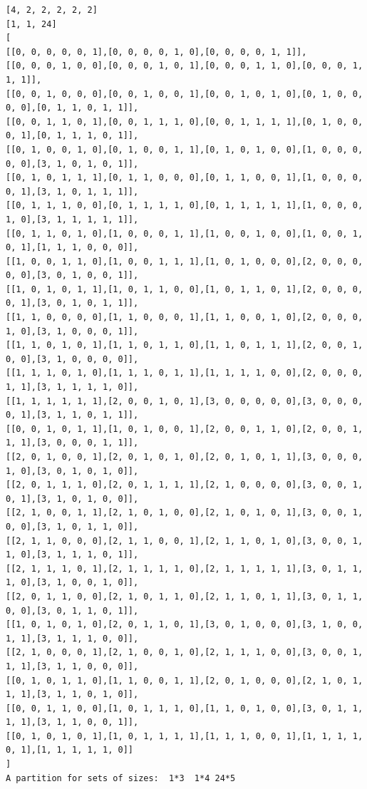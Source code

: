 \documentclass[final]{dmtcs-episciences}
\begin{document}
\begin{appendices}
\begin{verbatim}
[4, 2, 2, 2, 2, 2]
[1, 1, 24]
[
[[0, 0, 0, 0, 0, 1],[0, 0, 0, 0, 1, 0],[0, 0, 0, 0, 1, 1]],
[[0, 0, 0, 1, 0, 0],[0, 0, 0, 1, 0, 1],[0, 0, 0, 1, 1, 0],[0, 0, 0, 1, 1, 1]],
[[0, 0, 1, 0, 0, 0],[0, 0, 1, 0, 0, 1],[0, 0, 1, 0, 1, 0],[0, 1, 0, 0, 0, 0],[0, 1, 1, 0, 1, 1]],
[[0, 0, 1, 1, 0, 1],[0, 0, 1, 1, 1, 0],[0, 0, 1, 1, 1, 1],[0, 1, 0, 0, 0, 1],[0, 1, 1, 1, 0, 1]],
[[0, 1, 0, 0, 1, 0],[0, 1, 0, 0, 1, 1],[0, 1, 0, 1, 0, 0],[1, 0, 0, 0, 0, 0],[3, 1, 0, 1, 0, 1]],
[[0, 1, 0, 1, 1, 1],[0, 1, 1, 0, 0, 0],[0, 1, 1, 0, 0, 1],[1, 0, 0, 0, 0, 1],[3, 1, 0, 1, 1, 1]],
[[0, 1, 1, 1, 0, 0],[0, 1, 1, 1, 1, 0],[0, 1, 1, 1, 1, 1],[1, 0, 0, 0, 1, 0],[3, 1, 1, 1, 1, 1]],
[[0, 1, 1, 0, 1, 0],[1, 0, 0, 0, 1, 1],[1, 0, 0, 1, 0, 0],[1, 0, 0, 1, 0, 1],[1, 1, 1, 0, 0, 0]],
[[1, 0, 0, 1, 1, 0],[1, 0, 0, 1, 1, 1],[1, 0, 1, 0, 0, 0],[2, 0, 0, 0, 0, 0],[3, 0, 1, 0, 0, 1]],
[[1, 0, 1, 0, 1, 1],[1, 0, 1, 1, 0, 0],[1, 0, 1, 1, 0, 1],[2, 0, 0, 0, 0, 1],[3, 0, 1, 0, 1, 1]],
[[1, 1, 0, 0, 0, 0],[1, 1, 0, 0, 0, 1],[1, 1, 0, 0, 1, 0],[2, 0, 0, 0, 1, 0],[3, 1, 0, 0, 0, 1]],
[[1, 1, 0, 1, 0, 1],[1, 1, 0, 1, 1, 0],[1, 1, 0, 1, 1, 1],[2, 0, 0, 1, 0, 0],[3, 1, 0, 0, 0, 0]],
[[1, 1, 1, 0, 1, 0],[1, 1, 1, 0, 1, 1],[1, 1, 1, 1, 0, 0],[2, 0, 0, 0, 1, 1],[3, 1, 1, 1, 1, 0]],
[[1, 1, 1, 1, 1, 1],[2, 0, 0, 1, 0, 1],[3, 0, 0, 0, 0, 0],[3, 0, 0, 0, 0, 1],[3, 1, 1, 0, 1, 1]],
[[0, 0, 1, 0, 1, 1],[1, 0, 1, 0, 0, 1],[2, 0, 0, 1, 1, 0],[2, 0, 0, 1, 1, 1],[3, 0, 0, 0, 1, 1]],
[[2, 0, 1, 0, 0, 1],[2, 0, 1, 0, 1, 0],[2, 0, 1, 0, 1, 1],[3, 0, 0, 0, 1, 0],[3, 0, 1, 0, 1, 0]],
[[2, 0, 1, 1, 1, 0],[2, 0, 1, 1, 1, 1],[2, 1, 0, 0, 0, 0],[3, 0, 0, 1, 0, 1],[3, 1, 0, 1, 0, 0]],
[[2, 1, 0, 0, 1, 1],[2, 1, 0, 1, 0, 0],[2, 1, 0, 1, 0, 1],[3, 0, 0, 1, 0, 0],[3, 1, 0, 1, 1, 0]],
[[2, 1, 1, 0, 0, 0],[2, 1, 1, 0, 0, 1],[2, 1, 1, 0, 1, 0],[3, 0, 0, 1, 1, 0],[3, 1, 1, 1, 0, 1]],
[[2, 1, 1, 1, 0, 1],[2, 1, 1, 1, 1, 0],[2, 1, 1, 1, 1, 1],[3, 0, 1, 1, 1, 0],[3, 1, 0, 0, 1, 0]],
[[2, 0, 1, 1, 0, 0],[2, 1, 0, 1, 1, 0],[2, 1, 1, 0, 1, 1],[3, 0, 1, 1, 0, 0],[3, 0, 1, 1, 0, 1]],
[[1, 0, 1, 0, 1, 0],[2, 0, 1, 1, 0, 1],[3, 0, 1, 0, 0, 0],[3, 1, 0, 0, 1, 1],[3, 1, 1, 1, 0, 0]],
[[2, 1, 0, 0, 0, 1],[2, 1, 0, 0, 1, 0],[2, 1, 1, 1, 0, 0],[3, 0, 0, 1, 1, 1],[3, 1, 1, 0, 0, 0]],
[[0, 1, 0, 1, 1, 0],[1, 1, 0, 0, 1, 1],[2, 0, 1, 0, 0, 0],[2, 1, 0, 1, 1, 1],[3, 1, 1, 0, 1, 0]],
[[0, 0, 1, 1, 0, 0],[1, 0, 1, 1, 1, 0],[1, 1, 0, 1, 0, 0],[3, 0, 1, 1, 1, 1],[3, 1, 1, 0, 0, 1]],
[[0, 1, 0, 1, 0, 1],[1, 0, 1, 1, 1, 1],[1, 1, 1, 0, 0, 1],[1, 1, 1, 1, 0, 1],[1, 1, 1, 1, 1, 0]]
]
A partition for sets of sizes:  1*3  1*4 24*5
\end{verbatim}
\newpage


\end{appendices}
\end{document}
